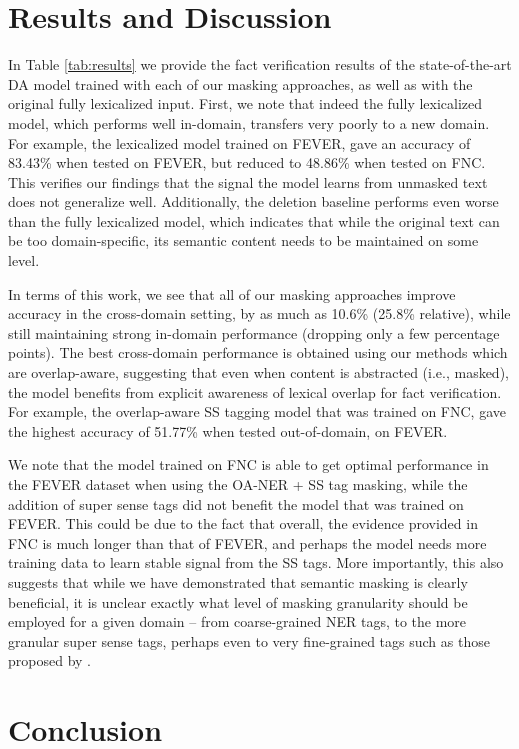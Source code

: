 \section{Results and Discussion}
\label{sec:results}

In Table \ref{tab:results} we provide the fact verification results of the state-of-the-art DA model trained with each of our masking approaches, as well as with the original fully lexicalized input.
First, we note that indeed the fully lexicalized model, which performs well in-domain, transfers very poorly to a new domain.
For example, the lexicalized model trained on FEVER,  gave an accuracy of 83.43\% when tested on FEVER, but reduced to 48.86\% when tested on FNC.
This verifies our findings that the signal the model learns from unmasked text does not generalize well.
Additionally, the deletion baseline performs even worse than the fully lexicalized model, which indicates that while the original text can be too domain-specific, its semantic content needs to be maintained on some level.

In terms of this work, we see that all of our masking approaches improve accuracy in the cross-domain setting, by as much as 10.6\% (25.8\% relative), while still maintaining strong in-domain performance (dropping only a few percentage points).
The best cross-domain performance is obtained using our methods which are overlap-aware, suggesting that even when content is abstracted (i.e., masked), the model benefits from explicit awareness of lexical overlap for fact verification. For example, the overlap-aware SS tagging model that was trained on FNC, gave the highest accuracy of 51.77\% when tested out-of-domain, on FEVER.

We note that the model trained on FNC is able to get optimal performance in the FEVER dataset when using the OA-NER + SS tag masking, while the addition of super sense tags did not benefit the model that was trained on FEVER.
This could be due to the fact that overall, the evidence provided in FNC is much longer than that of FEVER,
and perhaps the model needs more training data to learn stable signal from the SS tags.
More importantly, this also suggests that while we have demonstrated that semantic masking is clearly beneficial, it is unclear exactly what level of masking granularity should be employed for a given domain -- from coarse-grained NER tags, to the more granular super sense tags, perhaps even to very fine-grained tags such as those proposed by \citep{ling2012fine}.

\section{Conclusion}

